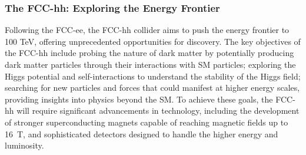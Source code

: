         \subsubsection{The FCC-hh: Exploring the Energy Frontier}
        Following the FCC-ee, the FCC-hh collider aims to push the energy frontier to 
        100 TeV, offering unprecedented opportunities for discovery. The key objectives 
        of the FCC-hh include probing the nature of dark matter by potentially producing 
        dark matter particles through their interactions with SM particles; 
        exploring the Higgs potential and self-interactions to understand the stability 
        of the Higgs field; searching for new particles and forces that could manifest 
        at higher energy scales, providing insights into physics beyond the SM.
        To achieve these goals, the FCC-hh will require significant advancements in 
        technology, including the development of stronger superconducting magnets 
        capable of reaching magnetic fields up to 16~T, and sophisticated detectors 
        designed to handle the higher energy and luminosity.

